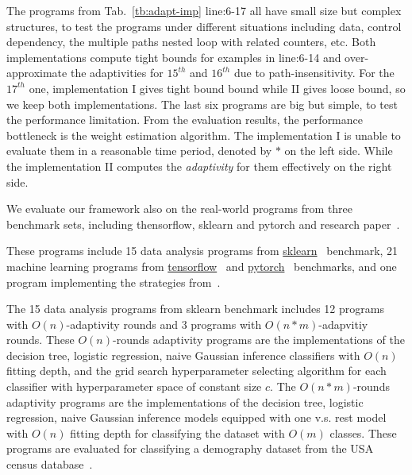 %
The programs from Tab.~\ref{tb:adapt-imp} line:6-17 all have small size but complex structures, to test the programs under different situations including
data, control dependency,
the multiple paths nested loop with related counters, etc.
Both implementations compute tight bounds for examples in line:6-14
and over-approximate the adaptivities for $15^{th}$ and $16^{th}$ due to path-insensitivity.
For the $17^{th}$ one, implementation I gives tight bound bound while II gives loose bound, so we keep both implementations.
The last six programs are big but simple,
to test the performance limitation. 
From the evaluation results, the performance bottleneck is the weight estimation algorithm.
The implementation I
is unable to evaluate them in a reasonable time period, denoted by $*$ on the left side.
While the implementation II computes the \emph{adaptivity} for
them effectively on the right side. 



We evaluate our framework also on the real-world programs from
three benchmark sets, including thensorflow, sklearn and pytorch and research paper~\cite{Jamieson2015TheAO}.

These programs include  
15 data analysis programs 
from \hyperlink{https://github.com/scikit-learn/scikit-learn/tree/main/examples}{sklearn}~\cite{SklearnBenchmark} benchmark,
21 machine learning programs
from \hyperlink{https://github.com/tensorflow/tensorflow/tree/master/tensorflow/examples}{tensorflow}~\cite{TensorflowBenchmark} 
and \hyperlink{https://github.com/pytorch/pytorch}{pytorch}~\cite{PytorchBenchmark}
benchmarks,
and {one program implementing the strategies from~\cite{Jamieson2015TheAO}}.

The 15 data analysis programs 
from sklearn benchmark includes 12 programs with $O(n)$-adaptivity rounds
and 3 programs with $O(n*m)$-adapvitiy rounds.
These $O(n)$-rounds adaptivity programs are
the
implementations of the decision tree, logistic regression, naive Gaussian inference classifiers
with $O(n)$ fitting depth,
and the grid search hyperparameter selecting algorithm for each classifier with 
hyperparameter space of constant size $c$.
The $O(n*m)$-rounds adaptivity programs are
the implementations of the  decision tree, logistic regression, naive Gaussian inference models equipped with one v.s. rest model with $O(n)$ fitting depth for classifying the dataset with $O(m)$ classes.
These programs are evaluated for classifying a demography dataset from 
the USA census database~\cite{CensusDatabase}.


